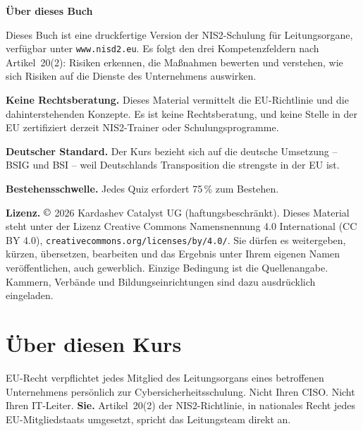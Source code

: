 \documentclass[11pt,a4paper,twoside]{book}
\begin{document}
\thispagestyle{empty}
\vspace*{\fill}
\begin{small}
\noindent\textbf{Über dieses Buch}

Dieses Buch ist eine druckfertige Version der NIS2-Schulung für Leitungsorgane, verfügbar unter \texttt{www.nisd2.eu}. Es folgt den drei Kompetenzfeldern nach Artikel~20(2): Risiken erkennen, die Maßnahmen bewerten und verstehen, wie sich Risiken auf die Dienste des Unternehmens auswirken.

\vspace{6pt}
\noindent\textbf{Keine Rechtsberatung.} Dieses Material vermittelt die EU-Richtlinie und die dahinterstehenden Konzepte. Es ist keine Rechtsberatung, und keine Stelle in der EU zertifiziert derzeit NIS2-Trainer oder Schulungsprogramme.

\vspace{6pt}
\noindent\textbf{Deutscher Standard.} Der Kurs bezieht sich auf die deutsche Umsetzung -- BSIG und BSI -- weil Deutschlands Transposition die strengste in der EU ist.

\vspace{6pt}
\noindent\textbf{Bestehensschwelle.} Jedes Quiz erfordert 75\,\% zum Bestehen.

\vspace{6pt}
\noindent\textbf{Lizenz.} $\copyright$ 2026 Kardashev Catalyst UG (haftungsbeschränkt). Dieses Material steht unter der Lizenz Creative Commons Namensnennung 4.0 International (CC BY 4.0), \texttt{creativecommons.org/licenses/by/4.0/}. Sie dürfen es weitergeben, kürzen, übersetzen, bearbeiten und das Ergebnis unter Ihrem eigenen Namen veröffentlichen, auch gewerblich. Einzige Bedingung ist die Quellenangabe. Kammern, Verbände und Bildungseinrichtungen sind dazu ausdrücklich eingeladen.
\end{small}
\vspace*{\fill}
\newpage

\tableofcontents
\newpage


\chapter*{Über diesen Kurs}

EU-Recht verpflichtet jedes Mitglied des Leitungsorgans eines betroffenen Unternehmens persönlich zur Cybersicherheitsschulung. Nicht Ihren CISO. Nicht Ihren IT-Leiter. \textbf{Sie.} Artikel~20(2) der NIS2-Richtlinie, in nationales Recht jedes EU-Mitgliedstaats umgesetzt, spricht das Leitungsteam direkt an.
\end{document}
